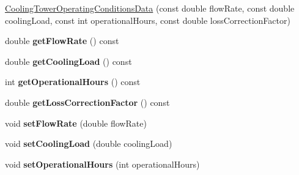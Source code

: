 \begin{DoxyCompactItemize}
\item 
\hyperlink{class_cooling_tower_operating_conditions_data_a51e6445c137db249bdc8d02ff1e1b7ff}{Cooling\+Tower\+Operating\+Conditions\+Data} (const double flow\+Rate, const double cooling\+Load, const int operational\+Hours, const double loss\+Correction\+Factor)
\item 
\mbox{\label{class_cooling_tower_operating_conditions_data_a6f61a2d4acaeedb86d534657c5fd8de6}} 
double {\bfseries get\+Flow\+Rate} () const
\item 
\mbox{\label{class_cooling_tower_operating_conditions_data_a3557f2c4d06aef39d8296438d0261b85}} 
double {\bfseries get\+Cooling\+Load} () const
\item 
\mbox{\label{class_cooling_tower_operating_conditions_data_a972d60974ad3d3cfb52068e6dbd27407}} 
int {\bfseries get\+Operational\+Hours} () const
\item 
\mbox{\label{class_cooling_tower_operating_conditions_data_ac071130167f5137c485f4ca9c60d1f78}} 
double {\bfseries get\+Loss\+Correction\+Factor} () const
\item 
\mbox{\label{class_cooling_tower_operating_conditions_data_a179ec1a769718787f3acc645624717c6}} 
void {\bfseries set\+Flow\+Rate} (double flow\+Rate)
\item 
\mbox{\label{class_cooling_tower_operating_conditions_data_a42559352dc04a59ce0b9f50dd1591e84}} 
void {\bfseries set\+Cooling\+Load} (double cooling\+Load)
\item 
\mbox{\label{class_cooling_tower_operating_conditions_data_a77c481059c024d9606d9d88426557162}} 
void {\bfseries set\+Operational\+Hours} (int operational\+Hours)
\item 
\mbox{\label{class_cooling_tower_operating_conditions_data_ac858a4d26003900b8cd9c53e257f6009}} 

\end{DoxyCompactItemize}
